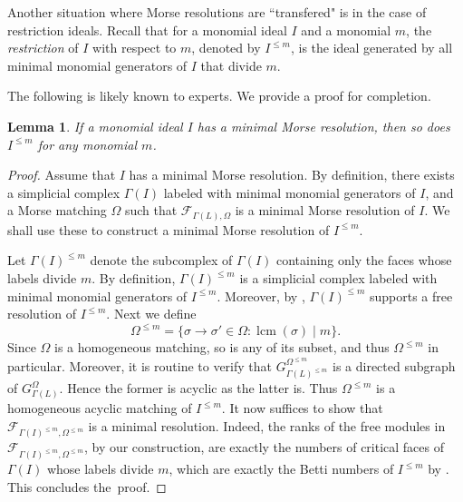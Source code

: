 \documentclass[reqno]{amsart}
\DeclareMathOperator{\lcm}{lcm}
\DeclareMathOperator{\E}{\mathcal{E}}
\newtheorem{lemma}[theorem]{Lemma}
\theoremstyle{definition}
\theoremstyle{remark}
\numberwithin{equation}{section}
\begin{document}
Another situation where Morse resolutions are ``transfered" is in the case of restriction ideals. Recall that for a monomial ideal $I$ and a monomial $m$, the \emph{restriction} of $I$ with respect to $m$, denoted by $I^{\leq m}$, is the ideal generated by all minimal monomial generators of $I$ that divide $m$.

The following is likely known to experts. We provide a proof for completion.

\begin{lemma}\label{lem:Morse-restriction}
    If a monomial ideal $I$ has a minimal Morse resolution, then so does $I^{\leq m}$ for any monomial $m$.
\end{lemma}

\begin{proof}
    Assume that $I$ has a minimal Morse resolution. By definition, there exists a simplicial complex $\Gamma(I)$ labeled with minimal monomial generators of $I$, and a Morse matching $\Omega$ such that $\mathcal{F}_{\Gamma(L),\Omega}$ is a minimal Morse resolution of $I$. We shall use these to construct a minimal Morse resolution of $I^{\leq m}$.
    
    Let $\Gamma(I)^{\leq m}$ denote the subcomplex of $\Gamma(I)$ containing only the faces whose labels divide $m$. By definition, $\Gamma(I)^{\leq m}$ is a simplicial complex labeled with minimal monomial generators of $I^{\leq m}$. Moreover, by \cite[Lemma 4.4]{HHZ-Dirac}, $\Gamma(I)^{\leq m}$ supports a free resolution of $I^{\leq m}$. Next we define
    \[
    \Omega^{\leq m} = \{\sigma \to \sigma'\in \Omega\colon \lcm(\sigma)\mid m \}.
    \]
    Since $\Omega$ is a homogeneous matching, so is any of its subset, and thus $\Omega^{\leq m}$ in particular. Moreover, it is routine to verify that $G_{\Gamma(L)^{\leq m}}^{\Omega^{\leq m}}$ is a directed subgraph of $G_{\Gamma(L)}^{\Omega}$. Hence the former is acyclic as the latter is. Thus $\Omega^{\leq m}$ is a homogeneous acyclic matching of $I^{\leq m}$. It now suffices to show that $\mathcal{F}_{\Gamma(I)^{\leq m},\Omega^{\leq m}}$ is a minimal resolution. Indeed, the ranks of the free modules in $\mathcal{F}_{\Gamma(I)^{\leq m},\Omega^{\leq m}}$, by our construction, are exactly the numbers of critical faces of $\Gamma(I)$ whose labels divide $m$, which are exactly the Betti numbers of $I^{\leq m}$ by \cite[Lemma 4.4]{HHZ-Dirac}. This concludes the~proof.
\end{proof}


\end{document}

